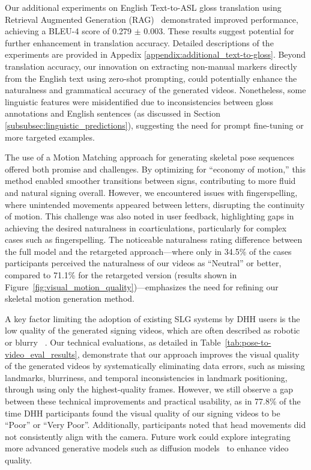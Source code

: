 Our additional experiments on English Text-to-ASL gloss translation using Retrieval Augmented Generation (RAG)~\cite{lewis2020retrieval} demonstrated improved performance, achieving a BLEU-4 score of 0.279 $\pm$ 0.003. These results suggest potential for further enhancement in translation accuracy. Detailed descriptions of the experiments are provided in Appedix \ref{appendix:additional_text-to-gloss}. Beyond translation accuracy, our innovation on extracting non-manual markers directly from the English text using zero-shot prompting, could potentially enhance the naturalness and grammatical accuracy of the generated videos. Nonetheless, some linguistic features were misidentified due to inconsistencies between gloss annotations and English sentences (as discussed in Section \ref{subsubsec:linguistic_predictions}), suggesting the need for prompt fine-tuning or more targeted examples. 

The use of a Motion Matching approach for generating skeletal pose sequences offered both promise and challenges. By optimizing for ``economy of motion,'' this method enabled smoother transitions between signs, contributing to more fluid and natural signing overall. However, we encountered issues with fingerspelling, where unintended movements appeared between letters, disrupting the continuity of motion. This challenge was also noted in user feedback, highlighting gaps in achieving the desired naturalness in coarticulations, particularly for complex cases such as fingerspelling. The noticeable naturalness rating difference between the full model and the retargeted approach---where only in 34.5\% of the cases participants perceived the naturalness of our videos as ``Neutral'' or better, compared to 71.1\% for the retargeted version (results shown in Figure~\ref{fig:visual_motion_quality})---emphasizes the need for refining our skeletal motion generation method. 

A key factor limiting the adoption of existing SLG systems by DHH users is the low quality of the generated signing videos, which are often described as robotic or blurry ~\cite{kipp2011assessing,tran2023us,huenerfauth2009sign,quandt2022attitudes}. Our technical evaluations, as detailed in Table~\ref{tab:pose-to-video_eval_results}, demonstrate that our approach improves the visual quality of the generated videos by systematically eliminating data errors, such as missing landmarks, blurriness, and temporal inconsistencies in landmark positioning, through using only the highest-quality frames. However, we still observe a gap between these technical improvements and practical usability, as in 77.8\% of the time DHH participants found the visual quality of our signing videos to be ``Poor'' or ``Very Poor''. Additionally, participants noted that head movements did not consistently align with the camera. 
Future work could explore integrating more advanced generative models such as diffusion models~\cite{croitoru2023diffusion,yang2023diffusion} to enhance video quality.

